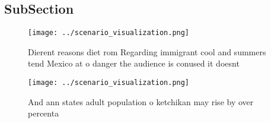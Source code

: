 \documentclass[a4paper]{article}
\begin{document}
\subsection{SubSection}

\begin{figure}
\centering
\texttt{[image: ../scenario\_visualization.png]}
\caption{Dierent reasons diet rom Regarding immigrant cool and summers tend Mexico at o danger the audience is conused it doesnt
}
\end{figure}
 
\begin{figure}
\centering
\texttt{[image: ../scenario\_visualization.png]}
\caption{And ann states adult population o ketchikan may rise by over percenta
}
\end{figure}
 
\end{document}

